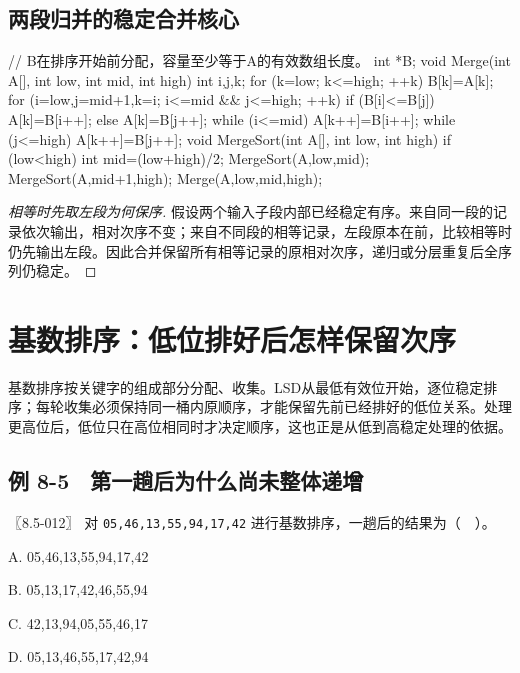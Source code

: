 \subsection{两段归并的稳定合并核心}\label{DS08-merge-code}

\par\medskip\noindent\begin{minipage}{\linewidth}
\begin{codeblock}[language=C++]
// B在排序开始前分配，容量至少等于A的有效数组长度。
int *B;
void Merge(int A[], int low, int mid, int high) {
    int i,j,k;
    for (k=low; k<=high; ++k) B[k]=A[k];
    for (i=low,j=mid+1,k=i; i<=mid && j<=high; ++k)
        if (B[i]<=B[j]) A[k]=B[i++];
        else A[k]=B[j++];
    while (i<=mid) A[k++]=B[i++];
    while (j<=high) A[k++]=B[j++];
}
void MergeSort(int A[], int low, int high) {
    if (low<high) {
        int mid=(low+high)/2;
        MergeSort(A,low,mid);
        MergeSort(A,mid+1,high);
        Merge(A,low,mid,high);
    }
}
\end{codeblock}
\end{minipage}\par\medskip

\begin{proof}[相等时先取左段为何保序]

假设两个输入子段内部已经稳定有序。来自同一段的记录依次输出，相对次序不变；来自不同段的相等记录，左段原本在前，比较相等时仍先输出左段。因此合并保留所有相等记录的原相对次序，递归或分层重复后全序列仍稳定。

\end{proof}

\section{基数排序：低位排好后怎样保留次序}\label{DS08-09}

基数排序按关键字的组成部分分配、收集。LSD从最低有效位开始，逐位稳定排序；每轮收集必须保持同一桶内原顺序，才能保留先前已经排好的低位关系。处理更高位后，低位只在高位相同时才决定顺序，这也正是从低到高稳定处理的依据。

\subsection{例 8-5　第一趟后为什么尚未整体递增}\label{DS08-ex5}

\begin{example}[配套案例]

〖8.5-012〗 对 \texttt{05,\allowbreak{}46,\allowbreak{}13,\allowbreak{}55,\allowbreak{}94,\allowbreak{}17,\allowbreak{}42} 进行基数排序，一趟后的结果为（　）。

A. 05,46,13,55,94,17,42

B. 05,13,17,42,46,55,94

C. 42,13,94,05,55,46,17

D. 05,13,46,55,17,42,94

\end{example}

